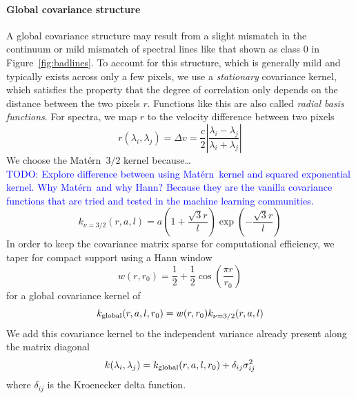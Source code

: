 \documentclass[iop,floatfix]{emulateapj}
\newcommand{\matern}{Mat\'{e}rn}
\newcommand{\todo}[1]{ \textcolor{Blue}{\\TODO: #1}}
\begin{document}
\paragraph{Global covariance structure}
A global covariance structure may result from a slight mismatch in the
 continuum or mild mismatch of spectral lines like that shown as class 0 in
 Figure~\ref{fig:badlines}. 
To account for this structure, which is generally mild and typically exists
 across only a few pixels, we use a \emph{stationary} covariance kernel, which
 satisfies the property that the degree of correlation only depends on the
 distance between the two pixels $r$. 
Functions like this are also called \emph{radial basis functions}. 
For spectra, we map $r$ to the velocity difference between two pixels
\begin{equation}
  r(\lambda_i, \lambda_j) = \Delta v = \frac{c}{2} \left | \frac{\lambda_i 
   - \lambda_j}{ \lambda_i + \lambda_j} \right |
\end{equation}
We choose the \matern\ $3/2$ kernel because\ldots
\todo{Explore difference between using \matern\ kernel and squared exponential
 kernel. 
Why \matern\ and why Hann? 
Because they are the vanilla covariance functions that are tried and tested in
 the machine learning communities.}
\begin{equation}
  k_{\nu = 3/2}(r, a, l) = a \left(1 + \frac{\sqrt{3} r}{l} \right ) \exp 
   \left (- \frac{\sqrt{3} r}{l} \right )
\end{equation}
In order to keep the covariance matrix sparse for computational efficiency, we
 taper for compact support using a Hann window
\begin{equation}
  w(r, r_0) = \frac{1}{2} + \frac{1}{2} \cos \left( \frac{\pi r}{r_0} \right) 
\end{equation}
for a global covariance kernel of 
\begin{equation}
  k_{\rm global} (r, a, l, r_0) = w(r, r_0) k_{\nu = 3/2}(r, a, l) 
  \label{eqn:global}
\end{equation}
We add this covariance kernel to the independent variance already present along
 the matrix diagonal
\begin{equation}
  k(\lambda_i, \lambda_j) = k_{\rm global}(r, a, l, r_0) + \delta_{ij} \sigma_{ij}^2
\end{equation}
where $\delta_{ij}$ is the Kroenecker delta function.
\end{document}
